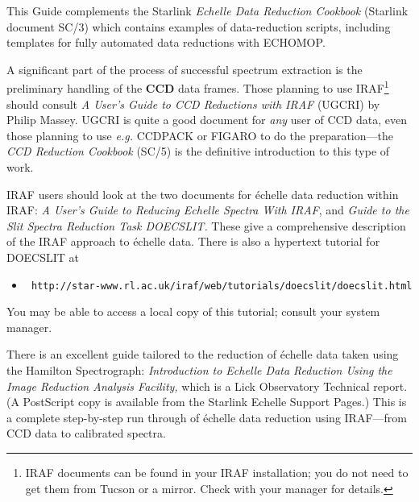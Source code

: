 \documentclass[twoside,11pt]{article}
\newcommand{\htmladdnormallink}[2]{#1}
\newenvironment{latexonly}{}{}
\newcommand{\htmlref}[2]{#1}
\newcommand{\xref}[3]{#1}
\newcommand{\sgspec}[2]{#1}
\newcommand{\sgspec}[2]{#2}
\begin{document}
This Guide complements the Starlink \xref{{\sl Echelle Data Reduction
Cookbook} (Starlink document SC/3)}{sc3}{} which contains examples of
data-reduction scripts, including templates for fully automated data
reductions with \xref{ECHOMOP}{sun152}{}\@.

A significant part of the process of successful spectrum extraction
is the preliminary handling of the \htmlref{{\bf CCD}}{gl_ccd} data frames.
Those planning to use
\htmladdnormallink{IRAF}
{http://star-www.rl.ac.uk/iraf/web/iraf-homepage.html}\sgspec{\footnote{IRAF
documents can be found in your IRAF installation; you
do not need to get them from Tucson or a mirror.  Check with your manager for
details.}}{{\em (All IRAF-related hyperlinks in this document are to the
UK-based Starlink IRAF mirror except \htmladdnormallink{this one}
{http://iraf.noao.edu/} which goes to the Tucson site.)}} should consult
\htmladdnormallink{{\sl A User's Guide to CCD Reductions with IRAF}}
{ftp://starlink-ftp.rl.ac.uk/pub/iraf/iraf/docs/ccduser2.ps.Z} (UGCRI) by Philip Massey.
UGCRI is quite a good document for {\em any} user of CCD data, even those
planning to use {\em e.g.} \xref{CCDPACK}{sun139}{} or
\xref{FIGARO}{sun86}{} to do the preparation\sgspec{---}{ - }the
\xref{{\sl CCD Reduction Cookbook} (SC/5)}{sc5}{} is the definitive
introduction to this type of work.

IRAF users should look at the two documents for \'{e}chelle data reduction
within IRAF:
\htmladdnormallink{{\sl A User's Guide to Reducing Echelle Spectra With IRAF}}
{ftp://starlink-ftp.rl.ac.uk/pub/iraf/iraf/docs/ech.ps.Z}, and
\htmladdnormallink{{\sl Guide to the Slit Spectra Reduction Task DOECSLIT.}}
{ftp://starlink-ftp.rl.ac.uk/pub/iraf/iraf/docs/doecslit.ps.Z}
These give a comprehensive description of the IRAF approach to \'{e}chelle
data.  There is also a hypertext tutorial for DOECSLIT at

\begin{itemize}

\item \htmladdnormallink{{\tt
      http://star-www.rl.ac.uk/iraf/web/tutorials/doecslit/doecslit.html}}
      {http://star-www.rl.ac.uk/iraf/web/tutorials/doecslit/doecslit.html}

\end{itemize}

You may be able to access a local copy of this tutorial; consult your
system manager.

There is an excellent guide tailored to the reduction of \'{e}chelle
data taken using the Hamilton Spectrograph:
\htmladdnormallink{{\sl Introduction to Echelle
Data Reduction  Using the Image Reduction Analysis Facility,}}
{http://www.star.ucl.ac.uk/\~{}mjc/echelle/misc/LickTech74.ps.gz} which is a
Lick Observatory Technical report\@.
\begin{latexonly}
(A PostScript copy is available from the Starlink Echelle Support
Pages.)
\end{latexonly}
This is a complete
step-by-step run through of \'{e}chelle data reduction using
IRAF\sgspec{---}{ - }from CCD data to calibrated spectra.
\end{document}
